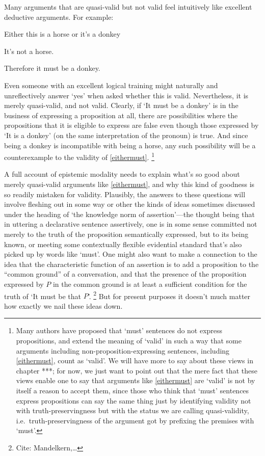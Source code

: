 \documentclass[If.tex]{subfiles}
\begin{document}
Many arguments that are quasi-valid but not valid feel intuitively like excellent deductive arguments. For example:
\begin{prop}
	\nitem \label{eithermust}
		Either this is a horse or it's a donkey

		It's not a horse.

		Therefore it must be a donkey.
\end{prop}
Even someone with an excellent logical training might naturally and unreflectively answer ‘yes’ when asked whether this is valid. Nevertheless, it is merely quasi-valid, and not valid.  Clearly, if ‘It must be a donkey’ is in the business of expressing a proposition at all, there are possibilities where the propositions that it is eligible to express are false even though those expressed by ‘It is a donkey’ (on the same interpretation of the pronoun) is true.  And since being a donkey is incompatible with being a horse, any such possibility will be a counterexample to the validity of \ref{eithermust}.%
\footnote{Many authors have proposed that ‘must’ sentences do not express propositions, and extend the meaning of ‘valid’ in such a way that some arguments including non-proposition-expressing sentences, including \ref{eithermust}, count as ‘valid’.  We will have more to say about these views in chapter ***; for now, we just want to point out that the mere fact that these views enable one to say that arguments like \ref{eithermust} are ‘valid’ is not by itself a reason to accept them, since those who think that ‘must’ sentences express propositions can say the same thing just by identifying validity not with truth-preservingness but with the status we are calling quasi-validity, i.e.\ truth-preservingness of the argument got by prefixing the premises with ‘must’.}

A full account of epistemic modality needs to explain what's so good about merely quasi-valid arguments like \ref{eithermust}, and why this kind of goodness is so readily mistaken for validity.  Plausibly, the answers to these questions will involve fleshing out in some way or other the kinds of ideas sometimes discussed under the heading of ‘the knowledge norm of assertion’---the thought being that in uttering a declarative sentence assertively, one is in some sense committed not merely to the truth of the proposition semantically expressed, but to its being known, or meeting some contextually flexible evidential standard that's also picked up by words like ‘must’.  One might also want to make a connection to the idea \citep{StalnakerAssertion} that the characteristic function of an assertion is to add a proposition to the “common ground” of a conversation, and that the presence of the proposition expressed by $P$ in the common ground is at least a sufficient condition for the truth of ‘It must be that $P$’.%
\footnote{Cite: Mandelkern,…}  
But for present purposes it doesn't much matter how exactly we nail these ideas down.  
\end{document}
